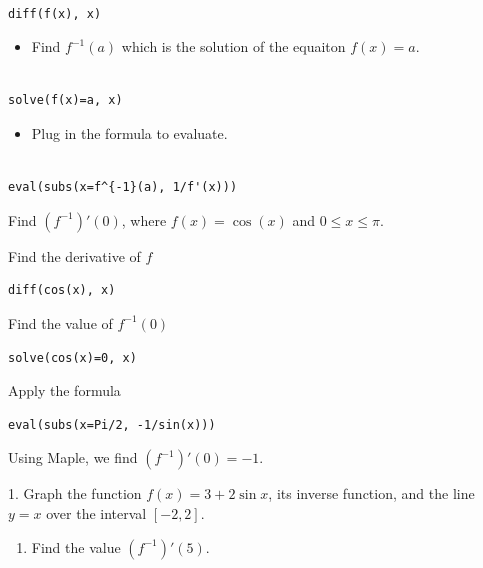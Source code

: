 \documentclass[]{book}
\providecommand{\tightlist}{%
  \setlength{\itemsep}{0pt}\setlength{\parskip}{0pt}}
\theoremstyle{definition}
\theoremstyle{definition}
\theoremstyle{definition}
\theoremstyle{remark}
\let\BeginKnitrBlock\begin \let\EndKnitrBlock\end
\begin{document}
\begin{verbatim}

diff(f(x), x)
\end{verbatim}

\begin{itemize}
\tightlist
\item
  Find \(f^{-1}(a)\) which is the solution of the equaiton \(f(x)=a\).
\end{itemize}

\begin{verbatim}

solve(f(x)=a, x)
\end{verbatim}

\begin{itemize}
\tightlist
\item
  Plug in the formula to evaluate.
\end{itemize}

\begin{verbatim}

eval(subs(x=f^{-1}(a), 1/f'(x)))
\end{verbatim}

\BeginKnitrBlock{example}
\protect\hypertarget{exm:unnamed-chunk-94}{}{\label{exm:unnamed-chunk-94} }Find \((f^{-1})'(0)\), where \(f(x)=\cos(x)\) and \(0\leq x\leq \pi\).
\EndKnitrBlock{example}

\BeginKnitrBlock{solution}
{}
Find the derivative of \(f\)

\begin{verbatim}
diff(cos(x), x)
\end{verbatim}

Find the value of \(f^{-1}(0)\)

\begin{verbatim}
solve(cos(x)=0, x)
\end{verbatim}

Apply the formula

\begin{verbatim}
eval(subs(x=Pi/2, -1/sin(x)))
\end{verbatim}

Using Maple, we find \((f^{-1})'(0)=-1\).
\EndKnitrBlock{solution}

\BeginKnitrBlock{exercise}
\protect\hypertarget{exr:unnamed-chunk-96}{}{\label{exr:unnamed-chunk-96} }
1. Graph the function \(f(x)=3+2\sin x\), its inverse function, and the line \(y=x\) over the interval \([-2,2]\).

\begin{enumerate}
\def\labelenumi{\arabic{enumi}.}
\setcounter{enumi}{1}
\tightlist
\item
  Find the value \((f^{-1})'(5)\).
\end{enumerate}
\EndKnitrBlock{exercise}
\end{document}
